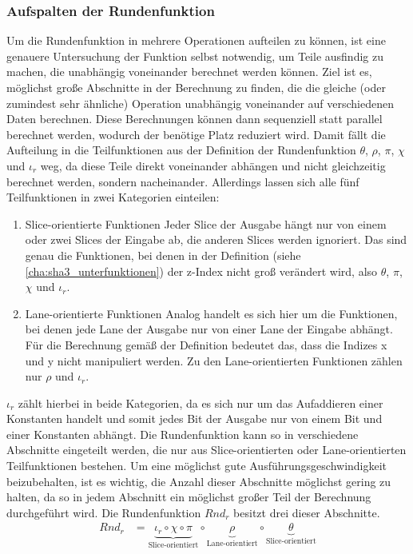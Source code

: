 \subsubsection{Aufspalten der Rundenfunktion}
\label{cha:iteration_1_modr}
Um die Rundenfunktion in mehrere Operationen aufteilen zu können, ist eine genauere Untersuchung der Funktion selbst notwendig, um Teile ausfindig zu machen,
die unabhängig voneinander berechnet werden können. Ziel ist es, möglichst große Abschnitte in der Berechnung zu finden, die die gleiche (oder zumindest sehr ähnliche)
Operation unabhängig voneinander auf verschiedenen Daten berechnen. Diese Berechnungen können dann sequenziell statt parallel berechnet werden,
wodurch der benötige Platz reduziert wird. Damit fällt die Aufteilung in die Teilfunktionen aus der Definition der Rundenfunktion $\theta$, $\rho$, $\pi$, $\chi$ und $\iota_r$
weg, da diese Teile direkt voneinander abhängen und nicht gleichzeitig berechnet werden, sondern nacheinander.
Allerdings lassen sich alle fünf Teilfunktionen in zwei Kategorien einteilen:
\begin{enumerate}
    \item Slice-orientierte Funktionen
        Jeder Slice der Ausgabe hängt nur von einem oder zwei Slices der Eingabe ab, die anderen Slices werden ignoriert. Das sind genau die Funktionen,
        bei denen in der Definition (siehe \ref{cha:sha3_unterfunktionen}) der z-Index nicht groß verändert wird, also $\theta$, $\pi$, $\chi$ und $\iota_r$.
    \item Lane-orientierte Funktionen
        Analog handelt es sich hier um die Funktionen, bei denen jede Lane der Ausgabe nur von einer Lane der Eingabe abhängt.
        Für die Berechnung gemäß der Definition bedeutet das, dass die Indizes x und y nicht manipuliert werden.
        Zu den Lane-orientierten Funktionen zählen nur $\rho$ und $\iota_r$.
\end{enumerate}
$\iota_r$ zählt hierbei in beide Kategorien, da es sich nur um das Aufaddieren einer Konstanten handelt und somit jedes Bit der Ausgabe nur von einem Bit und einer Konstanten abhängt.
Die Rundenfunktion kann so in verschiedene Abschnitte eingeteilt werden, die nur aus Slice-orientierten oder Lane-orientierten Teilfunktionen bestehen.
Um eine möglichst gute Ausführungsgeschwindigkeit beizubehalten, ist es wichtig, die Anzahl dieser Abschnitte möglichst gering zu halten,
da so in jedem Abschnitt ein möglichst großer Teil der Berechnung durchgeführt wird. Die Rundenfunktion $Rnd_r$ besitzt drei dieser Abschnitte.
\begin{align*}
    Rnd_r & = \underbrace{\iota_r \circ \chi \circ \pi}_\text{Slice-orientiert} \circ \underbrace{\rho}_\text{Lane-orientiert} \circ \underbrace{\theta}_\text{Slice-orientiert}
\end{align*}
